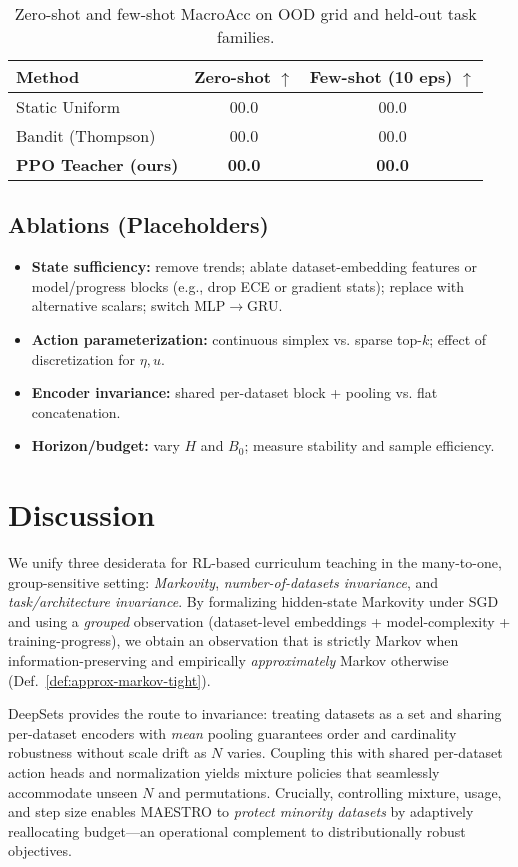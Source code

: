 \documentclass[11pt]{article}
\newcommand{\1}{\mathbf{1}}
\newcommand{\MAESTRO}{\textsc{MAESTRO}\xspace}
\begin{document}
\begin{table}[H]
\centering
\caption{Zero-shot and few-shot MacroAcc on OOD grid and held-out task families.}
\label{tab:ood}
\begin{tabular}{lcc}
\toprule
Method & Zero-shot $\uparrow$ & Few-shot (10 eps) $\uparrow$ \\
\midrule
Static Uniform & 00.0 & 00.0 \\
Bandit (Thompson) & 00.0 & 00.0 \\
\textbf{PPO Teacher (ours)} & \textbf{00.0} & \textbf{00.0} \\
\bottomrule
\end{tabular}
\end{table}

\subsection{Ablations (Placeholders)}
\begin{itemize}[leftmargin=1.5em]
\item \textbf{State sufficiency:} remove trends; ablate dataset-embedding features or model/progress blocks (e.g., drop ECE or gradient stats); replace with alternative scalars; switch MLP$\to$GRU.
\item \textbf{Action parameterization:} continuous simplex vs. sparse top-$k$; effect of discretization for $\eta,u$.
\item \textbf{Encoder invariance:} shared per-dataset block + pooling vs. flat concatenation.
\item \textbf{Horizon/budget:} vary $H$ and $B_0$; measure stability and sample efficiency.
\end{itemize}

\section{Discussion}
We unify three desiderata for RL-based curriculum teaching in the many-to-one, group-sensitive setting: \emph{Markovity}, \emph{number-of-datasets invariance}, and \emph{task/architecture invariance}. By formalizing hidden-state Markovity under SGD and using a \emph{grouped} observation (dataset-level embeddings + model-complexity + training-progress), we obtain an observation that is strictly Markov when information-preserving and empirically \emph{approximately} Markov otherwise (Def.~\ref{def:approx-markov-tight}). 

DeepSets provides the route to invariance: treating datasets as a set and sharing per-dataset encoders with \emph{mean} pooling guarantees order and cardinality robustness without scale drift as $N$ varies. Coupling this with shared per-dataset action heads and normalization yields mixture policies that seamlessly accommodate unseen $N$ and permutations. Crucially, controlling mixture, usage, and step size enables \MAESTRO{} to \emph{protect minority datasets} by adaptively reallocating budget—an operational complement to distributionally robust objectives.
\end{document}
